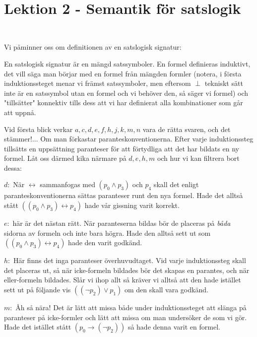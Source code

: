 \section{Lektion 2 - Semantik för satslogik}

\subsection{}\hfill\\

\noindent Vi påminner oss om definitionen av en satslogisk signatur:
\par
\noindent En satslogisk signatur är en mängd satssymboler. En formel definieras induktivt, det vill säga man börjar med en formel från mängden formler (notera, i första induktionssteget menar vi främst satssymboler, men eftersom $\perp$ tekniskt sätt inte är en satssymbol utan en formel och vi behöver den, så säger vi formel) och "tillsätter" konnektiv tills dess att vi har definierat alla kombinationer som går att uppnå.
\par\bigskip
\noindent Vid första blick verkar $a, c, d, e, f, h, j, k, m, n$ vara de rätta svaren, och det stämmer!... Om man förkastar paranteskonventionerna. Efter varje induktionssteg tillsätts en uppsättning paranteser för att förtydliga att det har bildats en ny formel. Låt oss därmed kika närmare på $d, e, h, m$ och hur vi kan filtrera bort dessa:
\par\bigskip
\noindent $d:$ När $\leftrightarrow$ sammanfogas med $(p_0\wedge p_3)$ och $p_4$ skall det enligt paranteskonventionerna sättas paranteser runt den nya formel. Hade det alltså stått $((p_0\wedge p_3)\leftrightarrow p_4)$ hade vår gissning varit korrekt. 
\par\bigskip
\noindent $e:$ här är det nästan rätt. När paranteserna bildas bör de placeras på \textit{båda} sidorna av formeln och inte bara högra. Hade den alltså sett ut som  $((p_0\wedge p_3)\leftrightarrow p_4)$ hade den varit godkänd.
\par\bigskip
\noindent $h:$ Här finns det inga paranteser överhuvudtaget. Vid varje induktionssteg skall det placeras ut, så när icke-formeln bildades bör det skapas en parantes, och när eller-formeln bildades. Slår vi ihop allt så kräver vi alltså att den hade istället sett ut på följande vis $((\neg p_2)\vee p_1)$ om den skall vara godkänd.
\par\bigskip
\noindent $m:$ Åh så nära! Det är lätt att missa både under induktionssteget att slänga på paranteser på icke-formler och lätt att missa om man undersöker de som vi gör. Hade det istället stått $(p_0\rightarrow(\neg p_2))$ så hade denna varit en formel. 
